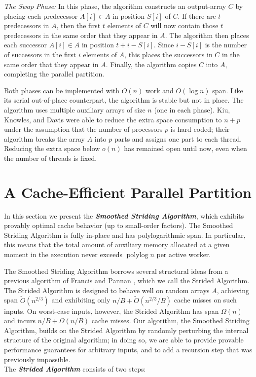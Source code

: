 \documentclass[a4paper,UKenglish,cleveref, autoref, thm-restate]{lipics-v2019}
\DeclareMathOperator{\polylog}{\text{polylog}}
\newcommand{\defn}[1]{{\textit{\textbf{\boldmath #1}}}}
\renewcommand{\paragraph}[1]{\vspace{0.09in}\noindent{\bf \boldmath #1.}}
\begin{document}
\noindent\emph{The Swap Phase: }In this phase, the algorithm constructs
an output-array $C$ by placing each predecessor $A[i] \in A$ in
position $S[i]$ of $C$. If there are $t$ predecessors in $A$, then the
first $t$ elements of $C$ will now contain those $t$ predecessors in
the same order that they appear in $A$. The algorithm then places each
successor $A[i] \in A$ in position $t + i - S[i]$. Since $i - S[i]$ is
the number of successors in the first $i$ elements of $A$, this places
the successors in $C$ in the same order that they appear in
$A$. Finally, the algorithm copies $C$ into $A$, completing the
parallel partition.

Both phases can be implemented with $O(n)$ work and $O(\log n)$
span. Like its serial out-of-place counterpart, the algorithm is
stable but not in place. The algorithm uses multiple auxiliary arrays
of size $n$ (one in each phase). Kiu, Knowles, and Davis
\cite{LiuKn05} were able to reduce the extra space consumption to
$n + p$ under the assumption that the number of processors $p$ is
hard-coded; their algorithm breaks the array $A$ into $p$ parts and
assigns one part to each thread. Reducing the extra space below $o(n)$
has remained open until now, even when the number of threads is fixed.

\section{A Cache-Efficient Parallel Partition}
\label{sec:recursiveSmoothedStriding}

In this section we present the \defn{Smoothed Striding
Algorithm}, which exhibits provably optimal cache behavior (up to
small-order factors). The Smoothed Striding Algorithm is fully
in-place and has polylogarithmic span. In particular, this means
that the total amount of auxiliary memory allocated at a given
moment in the execution never exceeds $\polylog n$ per active
worker.

\paragraph{The Strided Algorithm \cite{FrancisPa92}}
The Smoothed Striding Algorithm borrows several structural ideas
from a previous algorithm of Francis and Pannan
\cite{FrancisPa92}, which we call the Strided Algorithm. The
Strided Algorithm is designed to behave well on random arrays
$A$, achieving span $\tilde{O}(n^{2/3})$ and exhibiting only $n/B
+ \tilde{O}(n^{2/3} / B)$  cache misses on such inputs. On
worst-case inputs, however, the Strided Algorithm has span
$\Omega(n)$ and incurs $n/B + \Omega(n/B)$ cache misses. Our
algorithm, the Smoothed Striding Algorithm, builds on the Strided
Algorithm by randomly perturbing the internal structure of the
original algorithm; in doing so, we are able to provide provable
performance guarantees for arbitrary inputs, and to add a
recursion step that was previously impossible. \\
The \defn{Strided Algorithm} consists of two steps:
\end{document}
